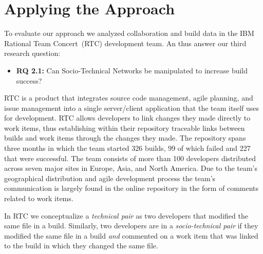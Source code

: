 \section{Applying the Approach}
To evaluate our approach we analyzed collaboration and build data in the IBM Rational Team Concert\texttrademark\ (RTC) development team. An thus answer our third research question:
\begin{itemize}
\item \textbf{RQ 2.1:} Can Socio-Technical Networks be manipulated to increase build success?
\end{itemize}
RTC is a product that integrates source code management, agile planning, and issue management into a single server/client application that the team itself uses for development.
RTC allows developers to link changes they made directly to work items, thus establishing within their repository traceable links between builds and work items through the changes they made.
The repository spans three months in which the team started 326 builds, 99 of which failed and 227 that were successful. 
The team consists of more than 100 developers distributed across seven major sites in Europe, Asia, and North America. Due to the team's geographical distribution and agile development process the team's  communication is largely found in the online repository in the form of comments related to work items. 


In RTC we conceptualize a \emph{technical pair} as two developers that modified the same file in a build.
Similarly, two developers are in a \emph{socio-technical pair} if they modified the same file in a build \emph{and} commented on a work item that was linked to the build in which they changed the same file.

